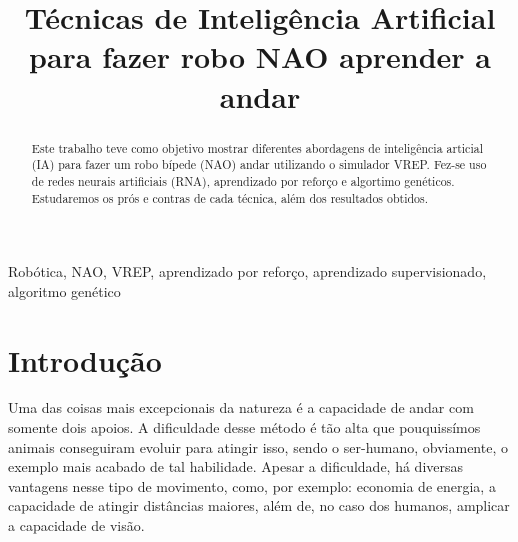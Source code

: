 \documentclass[twoside,conference,a4paper]{IEEEtran}
\begin{document}
\renewcommand{\IEEEkeywordsname}{Palavras-chave}


\title{Técnicas de Inteligência Artificial para fazer robo NAO aprender a andar}
\author{%
}


\maketitle

\begin{abstract}
Este trabalho teve como objetivo mostrar diferentes abordagens de inteligência articial (IA) para fazer um robo bípede (NAO) andar utilizando o simulador VREP. Fez-se uso de redes neurais artificiais (RNA), aprendizado por reforço e algortimo genéticos. Estudaremos os prós e contras de cada técnica, além dos resultados obtidos. 
\end{abstract}

\begin{IEEEkeywords}
 Robótica, NAO, VREP, aprendizado por reforço, aprendizado supervisionado, algoritmo genético
\end{IEEEkeywords}


\section{Introdução}

Uma das coisas mais excepcionais da natureza é a capacidade de andar com somente dois apoios. A dificuldade desse método é tão alta que pouquissímos animais conseguiram evoluir para atingir isso, sendo o ser-humano, obviamente, o exemplo mais acabado de tal habilidade. Apesar a dificuldade, há diversas vantagens nesse tipo de movimento, como, por exemplo: economia de energia, a capacidade de atingir distâncias maiores, além de, no caso dos humanos, amplicar a capacidade de visão. 
\end{document}
